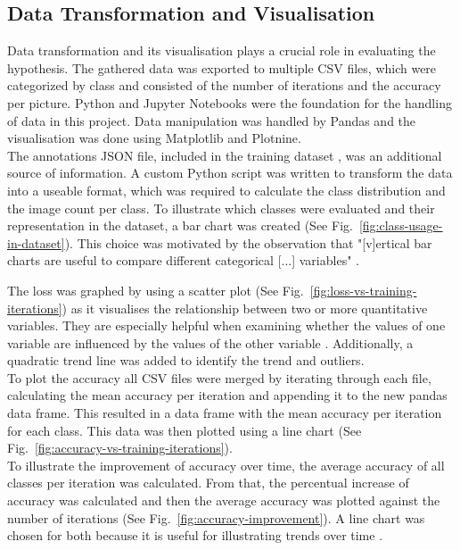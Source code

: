 \subsection{Data Transformation and Visualisation}
Data transformation and its visualisation plays a crucial role in evaluating the hypothesis. The gathered data was exported to multiple CSV files, 
which were categorized by class and consisted of the number of iterations and the accuracy per picture. Python and Jupyter Notebooks were the
foundation for the handling of data in this project. Data manipulation was handled by Pandas and the visualisation was done using Matplotlib
and Plotnine.\\

The annotations JSON file, included in the training dataset \parencite{pascal2023}, was an additional source of information. 
A custom Python script was written to transform the data into a useable format, which was required to calculate the class distribution 
and the image count per class. To illustrate which classes were evaluated and their representation in the dataset, a bar chart was created 
(See Fig.~\ref{fig:class-usage-in-dataset}). This choice was motivated by the observation that "[v]ertical bar charts are useful to compare 
different categorical [...] variables" \parencite{Statistics-Canada2021}.\\ 
\newpage

The loss was graphed by using a scatter plot (See Fig.~\ref{fig:loss-vs-training-iterations})
as it visualises the relationship between two or more quantitative variables. They are especially helpful when examining whether
the values of one variable are influenced by the values of the other variable \parencite{Statistics-Canada2021b}. 
Additionally, a quadratic trend line was added to identify the trend and outliers.\\ 

To plot the accuracy all CSV files were merged by iterating through each file, calculating the mean accuracy per iteration and appending it
to the new pandas data frame. This resulted in a data frame with the mean accuracy per iteration for each class. This data was then plotted using
a line chart (See Fig.~\ref{fig:accuracy-vs-training-iterations}). \\ 

To illustrate the improvement of accuracy over time, the average accuracy of all classes per iteration was calculated.
From that, the percentual increase of accuracy was calculated and then the average accuracy was plotted against the number of iterations
(See Fig.~\ref{fig:accuracy-improvement}).
A line chart was chosen for both because it is useful for illustrating trends over time \parencite{Statistics-Canada2021a}.\\

